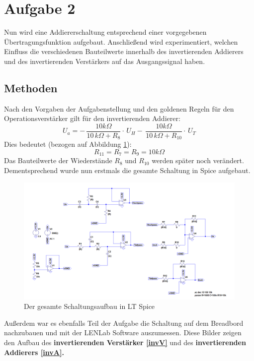 \section{Aufgabe 2}
Nun wird eine Addiererschaltung entsprechend einer vorgegebenen Übertragungsfunktion aufgebaut. Anschließend wird experimentiert, welchen Einfluss die verschiedenen Bauteilwerte innerhalb des invertierenden Addierers und des invertierenden Verstärkers auf das Ausgangssignal haben.

\subsection{Methoden}
Nach den Vorgaben der Aufgabenstellung und den goldenen Regeln für den Operationsverstärker \cite{skript} gilt für den invertierenden Addierer:
\begin{equation}
U_{a}=-\,{\frac {10k\Omega }{10\,k\Omega +R_{8}}}\cdot\,U_{H}-\,{\frac {10k
\Omega}{10\,k\Omega +R_{10}}}\cdot\,U_{T}
\end{equation}
Dies bedeutet (bezogen auf Abbildung \ref{spicegesamt}):
\begin{equation}
R_{11}=R_{7}=R_{9}=10\si{k\Omega}
\end{equation}
Das Bauteilwerte der Wiederstände $R_{8}$ und  $R_{10}$ werden später noch verändert.
Dementsprechend wurde nun erstmals die gesamte Schaltung in Spice aufgebaut.\newline

\begin{figure}[h]
\includegraphics[width=14cm]{pics/SpiceSchaltungGesamt.png}
\caption{Der gesamte Schaltungsaufbau in LT Spice}
\label{spicegesamt}
\end{figure}

\newpage
Außerdem war es ebenfalls Teil der Aufgabe die Schaltung auf dem Breadbord nachzubauen und mit der LENLab Software auszumessen. Diese Bilder zeigen den Aufbau des \textbf{invertierenden Verstärker \ref{invV}} und des \textbf{invertierenden Addierers \ref{invA}.}

